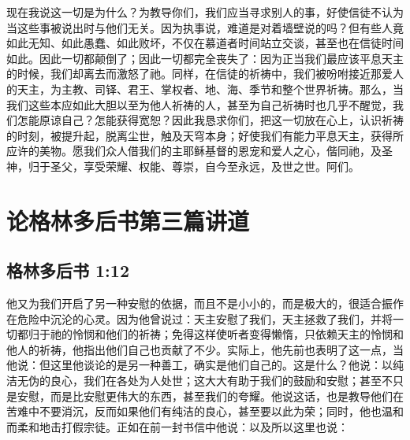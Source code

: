 现在我说这一切是为什么？为教导你们，我们应当寻求别人的事，好使信徒不认为当这些事被说出时与他们无关。因为执事说，难道是对着墙壁说的吗？但有些人竟如此无知、如此愚蠢、如此败坏，不仅在慕道者时间站立交谈，甚至也在信徒时间如此。因此一切都颠倒了；因此一切都完全丧失了：因为正当我们最应该平息天主的时候，我们却离去而激怒了祂。同样，在信徒的祈祷中，我们被吩咐接近那爱人的天主，为主教、司铎、君王、掌权者、地、海、季节和整个世界祈祷。那么，当我们这些本应如此大胆以至为他人祈祷的人，甚至为自己祈祷时也几乎不醒觉，我们怎能原谅自己？怎能获得宽恕？因此我恳求你们，把这一切放在心上，认识祈祷的时刻，被提升起，脱离尘世，触及天穹本身；好使我们有能力平息天主，获得所应许的美物。愿我们众人借我们的主耶稣基督的恩宠和爱人之心，偕同祂，及圣神，归于圣父，享受荣耀、权能、尊崇，自今至永远，及世之世。阿们。\par



\section{论格林多后书第三篇讲道}


\subsection{格林多后书 1:12}

\par

他又为我们开启了另一种安慰的依据，而且不是小小的，而是极大的，很适合振作在危险中沉沦的心灵。因为他曾说过：天主安慰了我们，天主拯救了我们，并将一切都归于祂的怜悯和他们的祈祷；免得这样使听者变得懒惰，只依赖天主的怜悯和他人的祈祷，他指出他们自己也贡献了不少。实际上，他先前也表明了这一点，当他说：但这里他谈论的是另一种善工，确实是他们自己的。这是什么？他说：以纯洁无伪的良心，我们在各处为人处世；这大大有助于我们的鼓励和安慰；甚至不只是安慰，而是比安慰更伟大的东西，甚至我们的夸耀。他说这话，也是教导他们在苦难中不要消沉，反而如果他们有纯洁的良心，甚至要以此为荣；同时，他也温和而柔和地击打假宗徒。正如在前一封书信中他说：以及所以这里也说：\par

